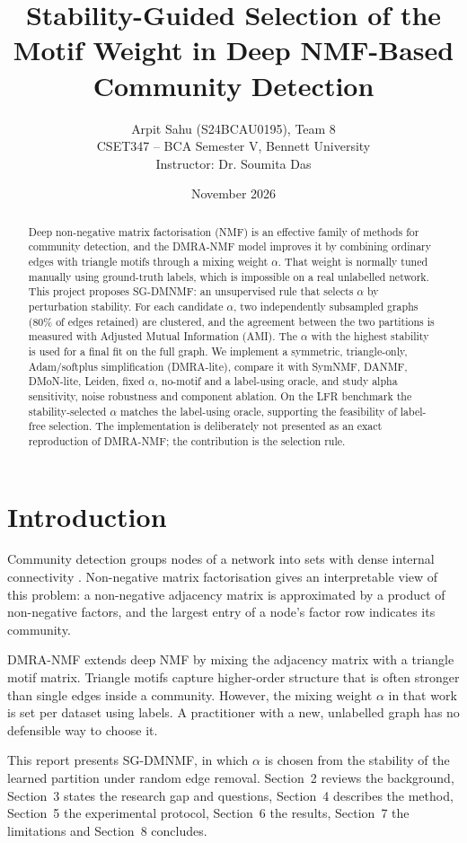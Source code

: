 \documentclass[11pt,a4paper]{article}
\title{\textbf{Stability-Guided Selection of the Motif Weight in Deep NMF-Based Community Detection}}
\author{Arpit Sahu (S24BCAU0195), Team 8\\
CSET347 -- BCA Semester V, Bennett University\\
Instructor: Dr. Soumita Das}
\date{November 2026}
\begin{document}
\maketitle

\begin{abstract}
Deep non-negative matrix factorisation (NMF) is an effective family of methods for
community detection, and the DMRA-NMF model improves it by combining ordinary edges with
triangle motifs through a mixing weight $\alpha$. That weight is normally tuned manually
using ground-truth labels, which is impossible on a real unlabelled network. This project
proposes SG-DMNMF: an unsupervised rule that selects $\alpha$ by perturbation stability.
For each candidate $\alpha$, two independently subsampled graphs (80\% of edges retained)
are clustered, and the agreement between the two partitions is measured with Adjusted
Mutual Information (AMI). The $\alpha$ with the highest stability is used for a final fit on
the full graph. We implement a symmetric, triangle-only, Adam/softplus simplification
(DMRA-lite), compare it with SymNMF, DANMF, DMoN-lite, Leiden, fixed $\alpha$, no-motif and a
label-using oracle, and study alpha sensitivity, noise robustness and component ablation.
On the LFR benchmark the stability-selected $\alpha$ matches the label-using oracle,
supporting the feasibility of label-free selection. The implementation is deliberately not
presented as an exact reproduction of DMRA-NMF; the contribution is the selection rule.
\end{abstract}

\section{Introduction}
Community detection groups nodes of a network into sets with dense internal connectivity
\citep{newman2004}. Non-negative matrix factorisation gives an interpretable view of this
problem: a non-negative adjacency matrix is approximated by a product of non-negative
factors, and the largest entry of a node's factor row indicates its community.

DMRA-NMF \citep{sohrabi2026} extends deep NMF by mixing the adjacency matrix with a triangle
motif matrix. Triangle motifs capture higher-order structure that is often stronger than
single edges inside a community. However, the mixing weight $\alpha$ in that work is set per
dataset using labels. A practitioner with a new, unlabelled graph has no defensible way to
choose it.

This report presents SG-DMNMF, in which $\alpha$ is chosen from the stability of the learned
partition under random edge removal. Section~2 reviews the background, Section~3 states the
research gap and questions, Section~4 describes the method, Section~5 the experimental
protocol, Section~6 the results, Section~7 the limitations and Section~8 concludes.
\end{document}
